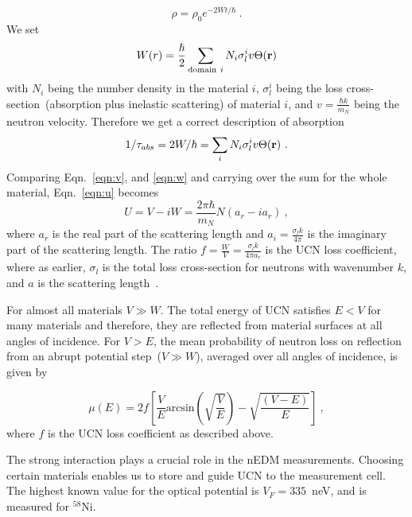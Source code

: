 \begin{equation}
\rho = \rho_0 e^{-2Wt/\hbar}~.
\end{equation}
We set
\begin{equation}
  \label{eqn:w}
W(r) = \frac{\hbar}{2}\sum_{\mathrm{domain}~i}N_i \sigma^i_l v \Theta(\bf{r})
\end{equation}
with $N_i$ being the number density in the material $i$, $\sigma^i_l$ being the loss
cross-section~(absorption plus inelastic scattering) of material $i$,
and $v = \frac{\hbar k}{m_N}$ being the neutron velocity.
Therefore we get a correct description of absorption
\begin{equation}
  1/\tau_{abs} = 2W/\hbar = \sum_i N_i \sigma^i_l v \Theta(\bf{r})~.
\end{equation}
Comparing Eqn.~\ref{eqn:v}, and \ref{eqn:w} and carrying over the sum
for the whole material, Eqn.~\ref{eqn:u} becomes
\begin{equation}
U = V - iW = \frac{2 \pi \hbar}{m_N} N(a_r - i a_r)~,
\end{equation}
where $a_r$ is the real part of the scattering length and
$a_i = \frac{\sigma_l k}{4\pi}$ is the imaginary part of the
scattering length. The ratio
$f = \frac{W}{V} = \frac{\sigma_l k}{4 \pi a_r}$ is the UCN loss
coefficient, where as earlier, $\sigma_l$ is the total loss
cross-section for neutrons with wavenumber $k$, and $a$ is the
scattering length~\cite{ucnbook}.

For almost all materials $V \gg W$. The total energy of UCN satisfies
$E < V$ for many materials and therefore, they are reflected from
material surfaces at all angles of incidence. For $V > E$, the mean
probability of neutron loss on reflection from an abrupt potential
step~($V \gg W$), averaged over all angles of incidence, is given
by~\cite{richardson1991measurement}

\begin{equation}
  \mu(E) = 2f \left[ \frac{V}{E} \mathrm{arcsin} \left( \sqrt{\frac{V}{E}} \right) - \sqrt{\frac{\left( V - E\right)}{E}} \right]~,
\end{equation}
where $f$ is the UCN loss coefficient as described above.


The strong interaction plays a crucial role in the nEDM
measurements. Choosing certain materials enables us to store and guide
UCN to the measurement cell. The highest known value for the optical
potential is $V_F=335$~neV, and is measured for $^{58}$Ni.




